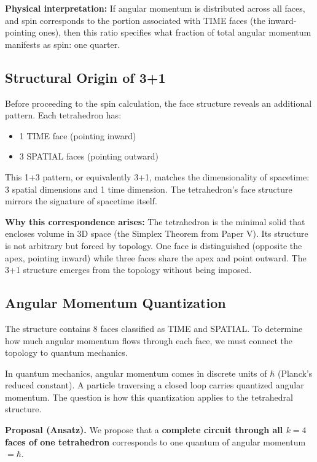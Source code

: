 \documentclass[aps,prd,preprint,superscriptaddress,showpacs,preprintnumbers,amsmath,amssymb,nofootinbib]{revtex4-2}
\begin{document}
\textbf{Physical interpretation:} If angular momentum is distributed across all faces, and spin corresponds to the portion associated with TIME faces (the inward-pointing ones), then this ratio specifies what fraction of total angular momentum manifests as spin: one quarter.

\subsection{Structural Origin of 3+1}
\label{subsec:3plus1}

Before proceeding to the spin calculation, the face structure reveals an additional pattern. Each tetrahedron has:
\begin{itemize}
\item 1 TIME face (pointing inward)
\item 3 SPATIAL faces (pointing outward)
\end{itemize}

This 1+3 pattern, or equivalently 3+1, matches the dimensionality of spacetime: 3 spatial dimensions and 1 time dimension. The tetrahedron's face structure mirrors the signature of spacetime itself.

\textbf{Why this correspondence arises:} The tetrahedron is the minimal solid that encloses volume in 3D space (the Simplex Theorem from Paper V). Its structure is not arbitrary but forced by topology. One face is distinguished (opposite the apex, pointing inward) while three faces share the apex and point outward. The 3+1 structure emerges from the topology without being imposed.

\subsection{Angular Momentum Quantization}
\label{subsec:quantization}

The structure contains 8 faces classified as TIME and SPATIAL. To determine how much angular momentum flows through each face, we must connect the topology to quantum mechanics.

In quantum mechanics, angular momentum comes in discrete units of $\hbar$ (Planck's reduced constant). A particle traversing a closed loop carries quantized angular momentum. The question is how this quantization applies to the tetrahedral structure.

\textbf{Proposal (Ansatz).} We propose that a \textbf{complete circuit through all $k=4$ faces of one tetrahedron} corresponds to one quantum of angular momentum $= \hbar$.
\end{document}
